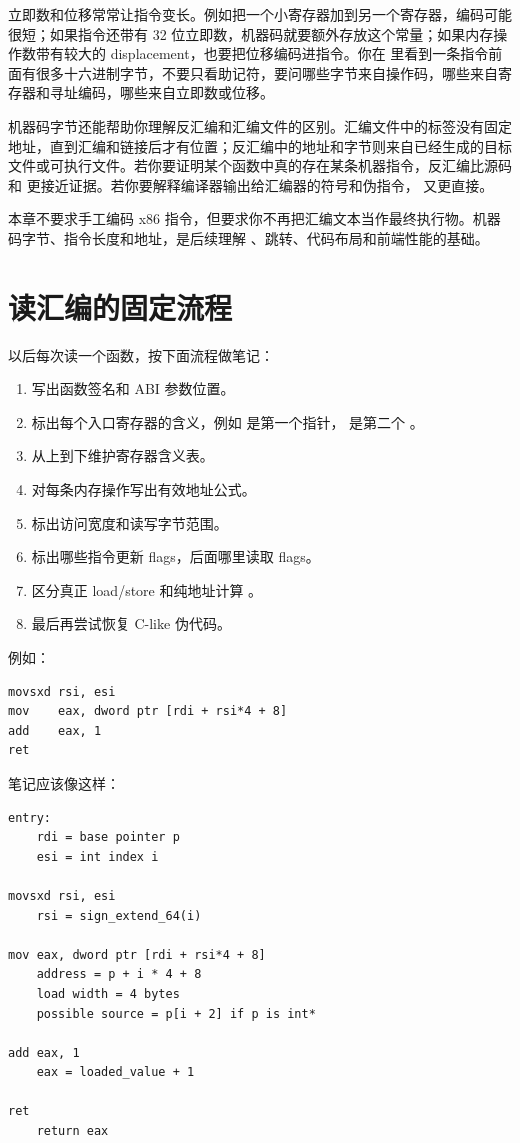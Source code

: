 立即数和位移常常让指令变长。例如把一个小寄存器加到另一个寄存器，编码可能很短；如果指令还带有 32 位立即数，机器码就要额外存放这个常量；如果内存操作数带有较大的 displacement，也要把位移编码进指令。你在  里看到一条指令前面有很多十六进制字节，不要只看助记符，要问哪些字节来自操作码，哪些来自寄存器和寻址编码，哪些来自立即数或位移。

机器码字节还能帮助你理解反汇编和汇编文件的区别。汇编文件中的标签没有固定地址，直到汇编和链接后才有位置；反汇编中的地址和字节则来自已经生成的目标文件或可执行文件。若你要证明某个函数中真的存在某条机器指令，反汇编比源码和  更接近证据。若你要解释编译器输出给汇编器的符号和伪指令， 又更直接。

\begin{deepdive}
本章不要求手工编码 x86 指令，但要求你不再把汇编文本当作最终执行物。机器码字节、指令长度和地址，是后续理解 、跳转、代码布局和前端性能的基础。
\end{deepdive}

\section{读汇编的固定流程}

以后每次读一个函数，按下面流程做笔记：

\begin{enumerate}
  \item 写出函数签名和 ABI 参数位置。
  \item 标出每个入口寄存器的含义，例如  是第一个指针， 是第二个 。
  \item 从上到下维护寄存器含义表。
  \item 对每条内存操作写出有效地址公式。
  \item 标出访问宽度和读写字节范围。
  \item 标出哪些指令更新 flags，后面哪里读取 flags。
  \item 区分真正 load/store 和纯地址计算 。
  \item 最后再尝试恢复 C-like 伪代码。
\end{enumerate}

例如：

\begin{lstlisting}
movsxd rsi, esi
mov    eax, dword ptr [rdi + rsi*4 + 8]
add    eax, 1
ret
\end{lstlisting}

笔记应该像这样：

\begin{lstlisting}
entry:
    rdi = base pointer p
    esi = int index i

movsxd rsi, esi
    rsi = sign_extend_64(i)

mov eax, dword ptr [rdi + rsi*4 + 8]
    address = p + i * 4 + 8
    load width = 4 bytes
    possible source = p[i + 2] if p is int*

add eax, 1
    eax = loaded_value + 1

ret
    return eax
\end{lstlisting}

